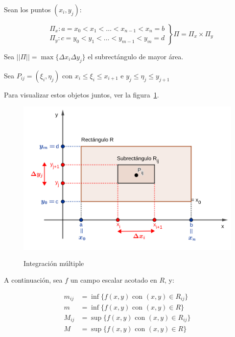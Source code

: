 \documentclass{article}
\begin{document}
Sean los puntos $(x_i, y_j)$:

\begin{equation}
\left.
\begin{array}{ll}
& \Pi_x: a = x_0 < x_1 < \ldots < x_{n-1} < x_n = b \\
& \Pi_y: c = y_0 < y_1 < \ldots < y_{m-1} < y_m = d
\end{array}
\right\} \Pi = \Pi_x \times \Pi_y
\end{equation}

Sea $||\Pi|| = \max\{ \Delta x_i \Delta y_j \}$ el subrectángulo de mayor área.

Sea $P_{ij} = (\xi_i, \eta_j)$ con $x_i \leq \xi_i \leq x_{i+1}$ e $y_j \leq \eta_j \leq y_{j+1}$

Para visualizar estos objetos juntos, ver la figura~\ref{fig:intmul}.

\begin{figure}[ht]
\centering
\caption{Integración múltiple}
\includegraphics[scale=0.8]{img/teo_fig023_im.png}
\label{fig:intmul}
\end{figure}

A continuación, sea $f$ un campo escalar acotado en $R$, y:

\begin{subequations}
\begin{align}
m_{ij} &= \inf \{ f(x,y) \text{ con } (x,y) \in R_{ij} \} \\
m &= \inf \{ f(x,y) \text{ con } (x,y) \in R \} \\
M_{ij} &= \sup \{ f(x,y) \text{ con } (x,y) \in R_{ij} \} \\
M &= \sup\{ f(x,y) \text{ con } (x,y) \in R \} \\
\end{align}
\end{subequations}
\end{document}
